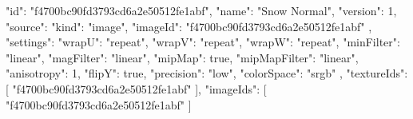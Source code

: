 {
  "id": "f4700bc90fd3793cd6a2e50512fe1abf",
  "name": "Snow Normal",
  "version": 1,
  "source": {
    "kind": "image",
    "imageId": "f4700bc90fd3793cd6a2e50512fe1abf"
  },
  "settings": {
    "wrapU": "repeat",
    "wrapV": "repeat",
    "wrapW": "repeat",
    "minFilter": "linear",
    "magFilter": "linear",
    "mipMap": true,
    "mipMapFilter": "linear",
    "anisotropy": 1,
    "flipY": true,
    "precision": "low",
    "colorSpace": "srgb"
  },
  "textureIds": [
    "f4700bc90fd3793cd6a2e50512fe1abf"
  ],
  "imageIds": [
    "f4700bc90fd3793cd6a2e50512fe1abf"
  ]
}
